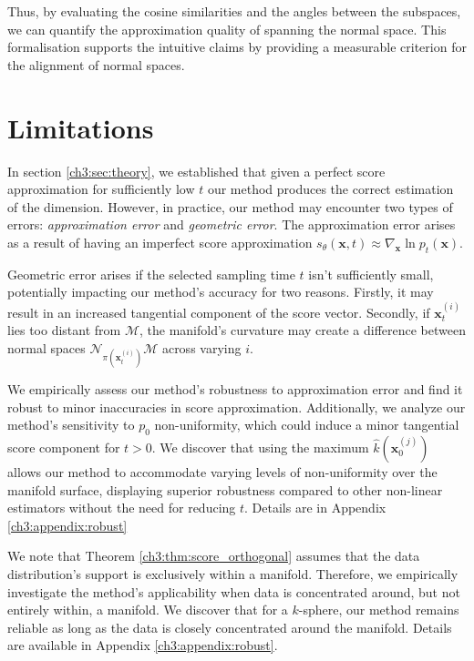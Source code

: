 Thus, by evaluating the cosine similarities and the angles between the subspaces, we can quantify the approximation quality of spanning the normal space. This formalisation supports the intuitive claims by providing a measurable criterion for the alignment of normal spaces.

\section{Limitations}
\label{ch3:sec:limitations}

In section \ref{ch3:sec:theory}, we established that given a perfect score approximation for sufficiently low $t$ our method produces the correct estimation of the dimension. However, in practice, our method may encounter two types of errors: \textit{approximation error} and \textit{geometric error}. The approximation error arises as a result of having an imperfect score approximation $s_\theta(\textbf{x}, t) \approx \nabla_\textbf{x} \ln p_t(\textbf{x})$. 

Geometric error arises if the selected sampling time $t$ isn't sufficiently small, potentially impacting our method's accuracy for two reasons. Firstly, it may result in an increased tangential component of the score vector. Secondly, if $\textbf{x}^{(i)}_t$ lies too distant from $\mathcal{M}$, the manifold's curvature may create a difference between normal spaces $\mathcal{N}_{\pi(\textbf{x}_t^{(i)})}\mathcal{M}$ across varying $i$.

We empirically assess our method's robustness to approximation error and find it robust to minor inaccuracies in score approximation. Additionally, we analyze our method's sensitivity to $p_0$ non-uniformity, which could induce a minor tangential score component for $t>0$. We discover that using the maximum $\hat{k}(\textbf{x}^{(j)}_0)$ allows our method to accommodate varying levels of non-uniformity over the manifold surface, displaying superior robustness compared to other non-linear estimators without the need for reducing $t$. Details are in Appendix \ref{ch3:appendix:robust}

We note that Theorem \ref{ch3:thm:score_orthogonal} assumes that the data distribution's support is exclusively within a manifold. Therefore, we empirically investigate the method's applicability when data is concentrated around, but not entirely within, a manifold. We discover that for a $k$-sphere, our method remains reliable as long as the data is closely concentrated around the manifold. Details are available in Appendix \ref{ch3:appendix:robust}.

